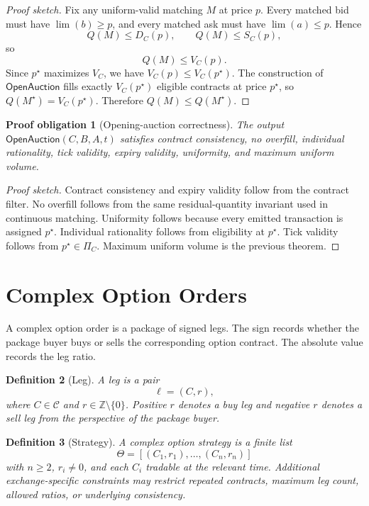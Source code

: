 \documentclass[11pt]{article}
\newtheorem{definition}{Definition}[section]
\newtheorem{proofobligation}[definition]{Proof obligation}
\newcommand{\Contracts}{\mathcal C}
\newcommand{\limitp}{\operatorname{lim}}
\begin{document}
\begin{proof}[Proof sketch]
Fix any uniform-valid matching \(M\) at price \(p\). Every matched bid must have \(\limitp(b)\ge p\), and every matched ask must have \(\limitp(a)\le p\). Hence
\[
Q(M)\le D_C(p),
\qquad
Q(M)\le S_C(p),
\]
so
\[
Q(M)\le V_C(p).
\]
Since \(p^\star\) maximizes \(V_C\), we have \(V_C(p)\le V_C(p^\star)\). The construction of \(\mathsf{OpenAuction}\) fills exactly \(V_C(p^\star)\) eligible contracts at price \(p^\star\), so \(Q(M^\star)=V_C(p^\star)\). Therefore \(Q(M)\le Q(M^\star)\).
\end{proof}

\begin{proofobligation}[Opening-auction correctness]
The output \(\mathsf{OpenAuction}(C,B,A,t)\) satisfies contract consistency, no overfill, individual rationality, tick validity, expiry validity, uniformity, and maximum uniform volume.
\end{proofobligation}

\begin{proof}[Proof sketch]
Contract consistency and expiry validity follow from the contract filter. No overfill follows from the same residual-quantity invariant used in continuous matching. Uniformity follows because every emitted transaction is assigned \(p^\star\). Individual rationality follows from eligibility at \(p^\star\). Tick validity follows from \(p^\star\in\Pi_C\). Maximum uniform volume is the previous theorem.
\end{proof}

\section{Complex Option Orders}\label{sec:complex}

A complex option order is a package of signed legs. The sign records whether the package buyer buys or sells the corresponding option contract. The absolute value records the leg ratio.

\begin{definition}[Leg]
A leg is a pair
\[
\ell=(C,r),
\]
where \(C\in\Contracts\) and \(r\in\mathbb Z\setminus\{0\}\). Positive \(r\) denotes a buy leg and negative \(r\) denotes a sell leg from the perspective of the package buyer.
\end{definition}

\begin{definition}[Strategy]
A complex option strategy is a finite list
\[
\Theta=[(C_1,r_1),\ldots,(C_n,r_n)]
\]
with \(n\ge 2\), \(r_i\ne0\), and each \(C_i\) tradable at the relevant time. Additional exchange-specific constraints may restrict repeated contracts, maximum leg count, allowed ratios, or underlying consistency.
\end{definition}
\end{document}

